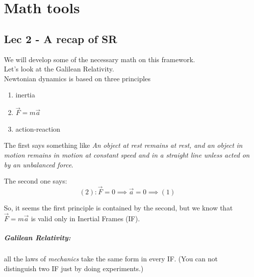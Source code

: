 \chapter{Math tools}
\section{Lec 2 - A recap of SR}
We will develop some of the necessary math on this framework. \\
Let's look at the Galilean Relativity. \\
Newtonian dynamics is based on three principles
\begin{enumerate}
	\item inertia
	\item $\vec{F} = m \vec{a}$
	\item action-reaction
\end{enumerate}
The first says something like \emph{An object at rest remains at rest, and an object in motion remains in motion at constant speed and in a straight line unless acted on by an unbalanced force}. \par
The second one says:
\[
	(2): \vec{F} = 0 \implies \vec{a} = 0 \implies (1)
\]

So, it seems the first principle is contained by the second, but we know that $\vec{F} = m \vec{a} $ is valid only in Inertial Frames (IF). \par
\paragraph{Galilean Relativity:} all the laws of \emph{mechanics} take the same form in every IF. (You can not distinguish two IF just by doing experiments.) \par

